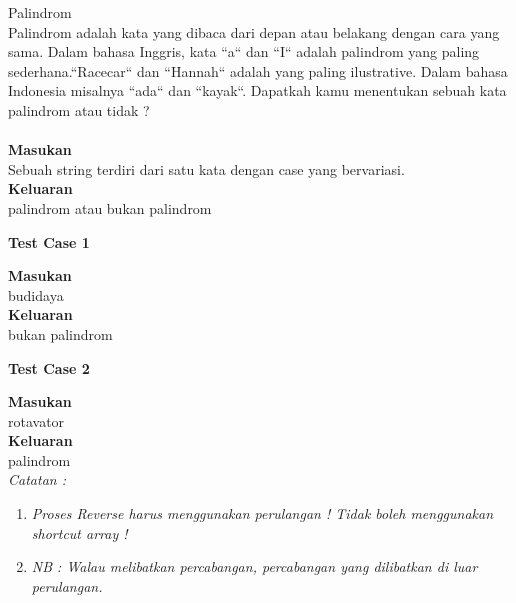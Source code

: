 \newpage
\begin{permasalahan}{Palindrom}\\
\label{prob:Palindrom}
	 Palindrom adalah kata yang dibaca dari depan atau belakang dengan cara yang sama. Dalam bahasa Inggris, kata ``a`` dan ``I`` adalah palindrom yang paling sederhana.``Racecar`` dan ``Hannah`` adalah yang paling ilustrative. Dalam bahasa Indonesia misalnya ``ada`` dan ``kayak``. Dapatkah kamu menentukan sebuah kata palindrom atau tidak ?\\\\
	\textbf{Masukan}\\
	Sebuah string terdiri dari satu kata dengan case yang bervariasi. \\
	\textbf{Keluaran}\\
	palindrom atau bukan palindrom\\
	\begin{center}
	\textbf{Test Case 1}\\
	\end{center}
	\textbf{Masukan}\\
	budidaya\\
	\textbf{Keluaran}\\
	bukan palindrom\\
	
	\begin{center}
	\textbf{Test Case 2}\\
	\end{center}
	\textbf{Masukan}\\
	rotavator\\
	\textbf{Keluaran}\\
	palindrom\\
	
	\textit{Catatan :}\\
	\begin{enumerate}
	\item \textit{Proses Reverse harus menggunakan perulangan ! Tidak boleh menggunakan shortcut array !}
	\item \textit{NB : Walau melibatkan percabangan, percabangan yang dilibatkan di luar perulangan.}
	\end{enumerate}
\end{permasalahan}

